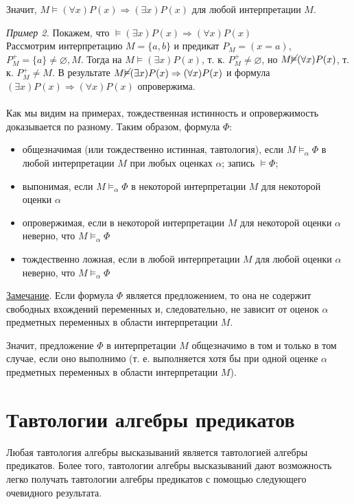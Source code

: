 Значит, $M \vDash (\forall x)P(x) \Rightarrow (\exists x)P(x)$ для любой интерпретации $M$.


{\it Пример 2.} Покажем, что $\vDash (\exists x)P(x) \Rightarrow (\forall x)P(x)$ \\
Рассмотрим интерпретацию $M=\{a, b\}$ и предикат $P_M=(x=a)$, $P_M^+ = \{a\} \neq \varnothing, M$. Тогда на $M \vDash (\exists x)P(x)$, т. к. $P_M^+ \neq \varnothing$, но $M \cancel{\vDash}(\forall x)P(x)$, т. к. $P_M^+ \neq M$. В результате $M \cancel{\vDash} (\exists x)P(x) \Rightarrow (\forall x)P(x)$ и формула $(\exists x)P(x) \Rightarrow (\forall x)P(x)$ опровержима. \\
\\
Как мы видим на примерах, тождественная истинность и опровержимость доказывается по разному. Таким образом, формула $\Phi$:
\begin{itemize}
    \item общезначимая (или тождественно истинная, тавтология), если $M \vDash_\alpha \Phi$ в любой интерпретации $M$ при любых оценках $\alpha$; запись $\vDash\Phi$;
    \item выпонимая, если $M \vDash_\alpha \Phi$ в некоторой интерпретации $M$ для некоторой оценки $\alpha$
    \item опровержимая, если в некоторой интерпретации $M$ для некоторой оценки $\alpha$ неверно, что $M \vDash_\alpha \Phi$
    \item тождественно ложная, если в любой интерпретации $M$ для любой оценки $\alpha$ неверно, что $M \vDash_\alpha \Phi$
\end{itemize}

\underline{Замечание}. Если формула $\Phi$ является предложением, то она не содержит свободных вхождений переменных и, следовательно, не зависит от оценок $\alpha$ предметных переменных в области интерпретации $M$.

Значит, предложение $\Phi$ в интерпретации $M$ общезначимо в том и только в том случае, если оно выполнимо (т. е. выполняется хотя бы при одной оценке $\alpha$ предметных переменных в области интерпретации $M$).

\section{Тавтологии алгебры предикатов}
Любая тавтология алгебры высказываний является тавтологией алгебры предикатов. Более того, тавтологии алгебры высказываний дают возможность легко получать тавтологии алгебры предикатов с помощью следующего очевидного результата.

